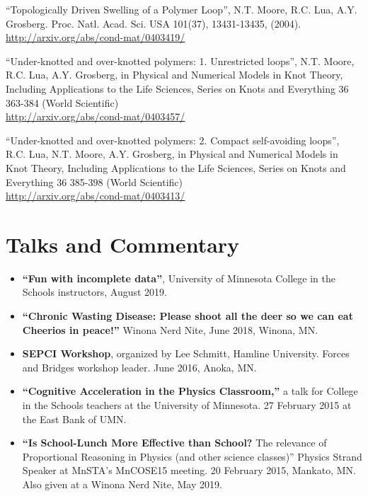 \documentclass[margin,line,letterpaper]{res}
\begin{document}
\begin{resume}
``Topologically Driven Swelling of a Polymer Loop'',
N.T. Moore, R.C. Lua, A.Y. Grosberg.
Proc. Natl. Acad. Sci. USA 101(37), 13431-13435, (2004).\\
\url{http://arxiv.org/abs/cond-mat/0403419/}

``Under-knotted and over-knotted polymers: 1. Unrestricted loops'',
N.T. Moore, R.C. Lua, A.Y. Grosberg,
in Physical and Numerical Models in Knot Theory, Including Applications to the Life Sciences,
        Series on  Knots and Everything 36 363-384 (World Scientific)\\
\url{http://arxiv.org/abs/cond-mat/0403457/}

``Under-knotted and over-knotted polymers: 2. Compact self-avoiding loops'',
R.C. Lua, N.T. Moore, A.Y. Grosberg,
in Physical and Numerical Models in Knot Theory, Including Applications to the Life Sciences,
        Series on  Knots and Everything 36 385-398 (World Scientific)\\
\url{http://arxiv.org/abs/cond-mat/0403413/}


\section{\bf Talks and Commentary}

\begin{itemize}
\item \textbf{``Fun with incomplete data''}, University of Minnesota College in the Schools instructors, August 2019.

\item \textbf{``Chronic Wasting Disease: Please shoot all the deer so we can eat Cheerios in peace!''} Winona Nerd Nite, June 2018, Winona, MN.

\item \textbf{SEPCI Workshop}, organized by Lee Schmitt, Hamline University.  Forces and Bridges workshop leader. June 2016, Anoka, MN.

\item \textbf{``Cognitive Acceleration in the Physics Classroom,''} a talk for College in the Schools teachers at the University of Minnesota.  27 February 2015 at the East Bank of UMN.  

\item 
\textbf{``Is School-Lunch More Effective than School?}
The relevance of Proportional Reasoning in Physics (and other science classes)'' Physics Strand Speaker at MnSTA's MnCOSE15 meeting.  20 February 2015, Mankato, MN.  Also given at a Winona Nerd Nite, May 2019.


\end{itemize}
\end{resume}
\end{document}
